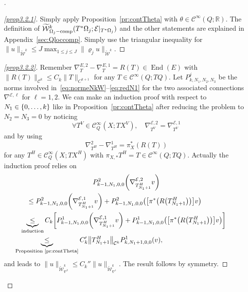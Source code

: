 \documentclass[10pt]{amsart}
\theoremstyle{definition}\newtheorem{defi}[theo]{Definition}\newtheorem{rema}[theo]{Remark}\newtheorem{exam}[theo]{Example}\newtheorem{exem}[theo]{Example}\newtheorem{nota}[theo]{Notation}
\newcommand{\R}{\mathbb{R}}
\newcommand{\clW}{\mathcal{W}}
\newcommand{\clC}{\mathcal{C}}
\newcommand{\clE}{\mathcal{E}}
\DeclareMathOperator{\End}{End}
\DeclareMathOperator{\ccomp}{comp}
\let\oldtilde\tilde
\renewcommand*{\tilde}[1]{\mathchoice{\widetilde{#1}}{\widetilde{#1}}{\oldtilde{#1}}{\oldtilde{#1}}}
\let\oldforall\forall
\renewcommand*{\forall}{\mathrel{\oldforall}}
\let\originalleft\left
\let\originalright\right
\renewcommand{\left}{\mathopen{}\mathclose\bgroup\originalleft}
\renewcommand{\right}{\aftergroup\egroup\originalright}
\newenvironment{proofc}[1][\proofname]{\begin{proof}[#1]}{\end{proof}}
\begin{document}
\begin{proofc}
\begin{proof}[{\eqref{prop3.2.1}}]
Simply apply Proposition~\ref{pr:contTheta} with $\theta\in \clC^{\infty}(Q;\R)$. The definition of $\tilde{\clW}^{k}_{\Omega_{j}-\ccomp}(T^{*}\Omega_{j};\clE|_{T^{*}\Omega_{j}})$ and the other statements are explained in Appendix~\ref{sec:Qloccomp}. Simply use the triangular inequality for $\|u\|_{\widetilde{\clW}^{k}}\leq J\max_{1\leq j\leq J}\|\varrho_{j}u\|_{\widetilde{\clW}^{k}}$.
\let\qed\relax
\end{proof}
\begin{proof}[{\eqref{prop3.2.2}}]
Remember $\nabla_{T}^{E,2}-\nabla_{T}^{E,1}=R(T)\in \End(E)$ with $\|R(T)\|_{\clC^{k}}\leq C_{k}\|T\|_{C^{k+1}}$ for any $T\in \clC^{\infty}(Q;TQ)$. Let $P_{k,N_{1},N_{2},N_{3}}^{j}$ be the norms involved in~\eqref{eq:normeNkW}--\eqref{eq:redN1} for the two associated connections $\nabla^{\clE,\ell}$ for $\ell=1,2$. We can make an induction proof with respect to $N_{1}\in \left\{0,\dots,k\right\}$ like in Proposition~\ref{pr:contTheta} after reducing the problem to $N_{2}=N_{3}=0$ by noticing
\[
\forall T^{V}\in \clC^{\infty}_{Q}(X;TX^{V}),\quad
\nabla_{T^{V}}^{\clE,2}=\nabla_{T^{V}}^{\clE,1}
\]
and by using
\[
\nabla_{T^{H}}^{2}-\nabla_{T^{H}}^{1}=\pi_{X}^{*}(R(T))
\]
for any $T^{H}\in \clC^{\infty}_{Q}(X;TX^{H})$ with $\pi_{X,*}T^{H}=T\in \clC^{\infty}(Q;TQ)$.
Actually the induction proof relies on
\begin{multline*}
P^{2}_{k-1,N_{1},0,0}\left(\nabla_{T_{N_{1}+1}^{H}}^{\clE,2}v\right)\\
\begin{aligned}
&\leq P^{2}_{k-1,N_{1},0,0}\left(\nabla_{T_{N_{1}+1}^{H}}^{\clE,1}v\right)+ P^{2}_{k-1,N_{1},0,0}\left(\left[\pi^{*}\left(R\left(T_{N_{1}+1}^{H}\right)\right)\right]v\right)\\
&\mkern-17mu\underbrace{\leq}_{\text{induction}}C_{k}\left[P^{1}_{k-1,N_{1},0,0}\left(\nabla_{T_{N_{1}+1}^{H}}^{\clE,1}v\right)+ P^{1}_{k-1,N_{1},0,0}\left(\left[\pi^{*}\left(R\left(T_{N_{1}+1}^{H}\right)\right)\right]v\right)\right]\\
&\mkern-33mu\underbrace{\leq}_{\text{Proposition~\ref{pr:contTheta}}} C_{k}'\left\|T_{N_{1}+1}^{H}\right\|_{\clC^{k}} P^{1}_{k,N_{1}+1,0,0}(v),
\end{aligned}
\end{multline*}
and leads to $\|u\|_{\widetilde{\clW}^{k}_{\nabla^{2}}}\leq C_{k}''\|u\|_{\widetilde{\clW}^{k}_{\nabla^{1}}}$. The result follows by symmetry.
\end{proof}
\let\qed\relax
\end{proofc}
\end{document}
